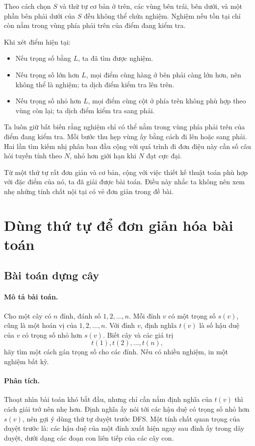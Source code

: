 \documentclass[11pt]{article}
\begin{document}
Theo cách chọn $S$ và thứ tự cơ bản ở trên, các vùng bên trái, bên dưới, và
một phần bên phải dưới của $S$ đều không thể chứa nghiệm. Nghiệm nếu tồn tại
chỉ còn nằm trong vùng phía phải trên của điểm đang kiểm tra.

Khi xét điểm hiện tại:
\begin{itemize}
  \item Nếu trọng số bằng $L$, ta đã tìm được nghiệm.
  \item Nếu trọng số lớn hơn $L$, mọi điểm cùng hàng ở bên phải càng lớn hơn,
  nên không thể là nghiệm; ta dịch điểm kiểm tra lên trên.
  \item Nếu trọng số nhỏ hơn $L$, mọi điểm cùng cột ở phía trên không phù hợp
  theo vùng còn lại; ta dịch điểm kiểm tra sang phải.
\end{itemize}

Ta luôn giữ bất biến rằng nghiệm chỉ có thể nằm trong vùng phía phải trên của
điểm đang kiểm tra. Mỗi bước thu hẹp vùng ấy bằng cách đi lên hoặc sang phải.
Hai lần tìm kiếm nhị phân ban đầu cộng với quá trình đi đơn điệu này cần số
câu hỏi tuyến tính theo $N$, nhỏ hơn giới hạn khi $N$ đạt cực đại.

Từ một thứ tự rất đơn giản và cơ bản, cộng với việc thiết kế thuật toán phù
hợp với đặc điểm của nó, ta đã giải được bài toán. Điều này nhắc ta không nên
xem nhẹ những tính chất nội tại có vẻ đơn giản trong đề bài.

\section{Dùng thứ tự để đơn giản hóa bài toán}

\subsection{Bài toán dựng cây}

\paragraph{Mô tả bài toán.}
Cho một cây có $n$ đỉnh, đánh số $1,2,\ldots,n$. Mỗi đỉnh $v$ có một trọng số
$s(v)$, cũng là một hoán vị của $1,2,\ldots,n$. Với đỉnh $v$, định nghĩa
$t(v)$ là số hậu duệ của $v$ có trọng số nhỏ hơn $s(v)$. Biết cây và các giá
trị
\[
  t(1),t(2),\ldots,t(n),
\]
hãy tìm một cách gán trọng số cho các đỉnh. Nếu có nhiều nghiệm, in một nghiệm
bất kỳ.

\paragraph{Phân tích.}
Thoạt nhìn bài toán khó bắt đầu, nhưng chỉ cần nắm định nghĩa của $t(v)$ thì
cách giải trở nên nhẹ hơn. Định nghĩa ấy nói tới các hậu duệ có trọng số nhỏ
hơn $s(v)$, nên gợi ý dùng thứ tự duyệt trước DFS. Một tính chất quan trọng
của duyệt trước là: các hậu duệ của một đỉnh xuất hiện ngay sau đỉnh ấy trong
dãy duyệt, dưới dạng các đoạn con liên tiếp của các cây con.
\end{document}
